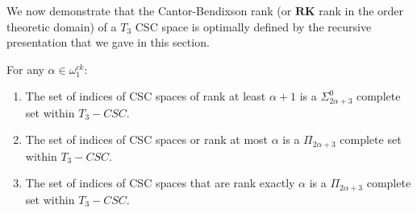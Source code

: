 \documentclass[11pt]{amsart}
\theoremstyle{remark}
\def\RK{\textbf{RK}}
\begin{document}
We now demonstrate that the Cantor-Bendixson rank (or $\RK$ rank in the order theoretic domain) of a $T_3$ CSC space is optimally defined by the recursive presentation that we gave in this section. 

\begin{proposition}
For any $\alpha\in\omega_1^{ck}$:
\begin{enumerate}
	\item The set of indices of CSC spaces of rank at least $\alpha+1$ is a $\Sigma_{2\alpha+3}^0$ complete set within $T_3-CSC$.
	\item The set of indices of CSC spaces or rank at most $\alpha$ is a $\Pi_{2\alpha+3}$ complete set within $T_3-CSC$.
	\item The set of indices of CSC spaces that are rank exactly $\alpha$ is a  $\Pi_{2\alpha+3}$ complete set within $T_3-CSC$.
\end{enumerate}

\end{proposition}
\end{document}
